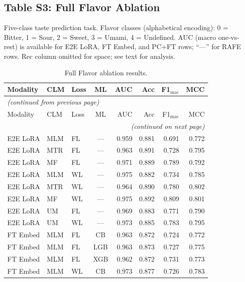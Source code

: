 \documentclass[9pt,a4paper]{article}
\begin{document}
\subsection*{Table S3: Full Flavor Ablation}

Five-class taste prediction task.
Flavor classes (alphabetical encoding): 0 = Bitter, 1 = Sour, 2 = Sweet, 3 = Umami,
4 = Undefined.
AUC (macro one-vs-rest) is available for E2E LoRA, FT Embed, and PC+FT rows;
``---'' for RAFE rows.
Rec column omitted for space; see text for analysis.

\begin{scriptsize}
\begin{longtable}{lllcrrrr}
\caption{Full Flavor ablation results.}
\label{tab:s3_flavor} \\
\toprule
Modality & CLM & Loss & ML & AUC & Acc & F1$_\text{mac}$ & MCC \\
\midrule
\endfirsthead
\multicolumn{8}{l}{\footnotesize\textit{(continued from previous page)}} \\
\toprule
Modality & CLM & Loss & ML & AUC & Acc & F1$_\text{mac}$ & MCC \\
\midrule
\endhead
\midrule
\multicolumn{8}{r}{\footnotesize\textit{(continued on next page)}} \\
\endfoot
\bottomrule
\endlastfoot
E2E LoRA & MLM & FL & --- & 0.959 & 0.881 & 0.691 & 0.772 \\
E2E LoRA & MTR & FL & --- & 0.963 & 0.891 & 0.728 & 0.795 \\
E2E LoRA & MF  & FL & --- & 0.971 & 0.889 & 0.789 & 0.792 \\
E2E LoRA & MLM & WL & --- & 0.975 & 0.882 & 0.734 & 0.785 \\
E2E LoRA & MTR & WL & --- & 0.964 & 0.890 & 0.780 & 0.802 \\
E2E LoRA & MF  & WL & --- & 0.975 & 0.892 & 0.809 & 0.801 \\
E2E LoRA & UM  & FL & --- & 0.969 & 0.883 & 0.771 & 0.790 \\
E2E LoRA & UM  & WL & --- & 0.973 & 0.885 & 0.783 & 0.795 \\
\midrule
FT Embed & MLM & FL & CB  & 0.963 & 0.872 & 0.724 & 0.772 \\
FT Embed & MLM & FL & LGB & 0.963 & 0.873 & 0.727 & 0.775 \\
FT Embed & MLM & FL & XGB & 0.962 & 0.872 & 0.731 & 0.773 \\
FT Embed & MLM & WL & CB  & 0.973 & 0.877 & 0.726 & 0.783 \\

\end{longtable}
\end{scriptsize}
\end{document}
